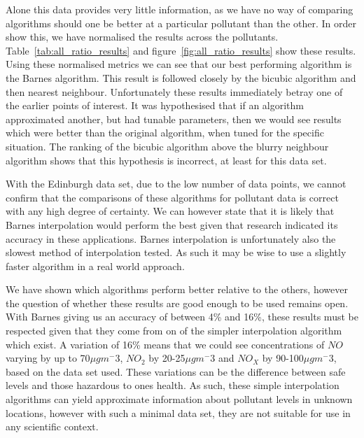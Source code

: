 
		Alone this data provides very little information, as we have no way of comparing algorithms should one be better at a particular pollutant than the other. In order show this, we have normalised the results across the pollutants. Table~\ref{tab:all_ratio_results} and figure~\ref{fig:all_ratio_results} show these results. Using these normalised metrics we can see that our best performing algorithm is the Barnes algorithm. This result is followed closely by the bicubic algorithm and then nearest neighbour. Unfortunately these results immediately betray one of the earlier points of interest. It was hypothesised that if an algorithm approximated another, but had tunable parameters, then we would see results which were better than the original algorithm, when tuned for the specific situation. The ranking of the bicubic algorithm above the blurry neighbour algorithm shows that this hypothesis is incorrect, at least for this data set. 

		With the Edinburgh data set, due to the low number of data points, we cannot confirm that the comparisons of these algorithms for pollutant data is correct with any high degree of certainty. We can however state that it is likely that Barnes interpolation would perform the best given that research indicated its accuracy in these applications. Barnes interpolation is unfortunately also the slowest method of interpolation tested. As such it may be wise to use a slightly faster algorithm in a real world approach. 

		We have shown which algorithms perform better relative to the others, however the question of whether these results are good enough to be used remains open. With Barnes giving us an accuracy of between 4\% and 16\%, these results must be respected given that they come from on of the simpler interpolation algorithm which exist. A variation of 16\% means that we could see concentrations of $NO$ varying by up to 70$\mu gm^-3$, $NO_{2}$ by 20-25$\mu gm^-3$ and $NO_{X}$ by 90-100$\mu gm^-3$, based on the data set used. These variations can be the difference between safe levels and those hazardous to ones health. As such, these simple interpolation algorithms can yield approximate information about pollutant levels in unknown locations, however with such a minimal data set, they are not suitable for use in any scientific context. 
